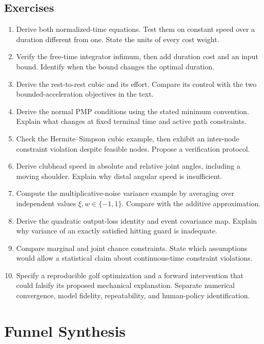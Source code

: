 \documentclass[12pt, openany]{book}
\theoremstyle{plain}
\begin{document}
\section{Exercises}

\begin{enumerate}[itemsep=3pt,parsep=0pt]
\item Derive both normalized-time equations. Test them on constant speed
over a duration different from one. State the units of every cost weight.
\item Verify the free-time integrator infimum, then add duration cost and
an input bound. Identify when the bound changes the optimal duration.
\item Derive the rest-to-rest cubic and its effort. Compare its control
with the two bounded-acceleration objectives in the text.
\item Derive the normal PMP conditions using the stated minimum convention.
Explain what changes at fixed terminal time and active path constraints.
\item Check the Hermite--Simpson cubic example, then exhibit an inter-node
constraint violation despite feasible nodes. Propose a verification protocol.
\item Derive clubhead speed in absolute and relative joint angles, including
a moving shoulder. Explain why distal angular speed is insufficient.
\item Compute the multiplicative-noise variance example by averaging over
independent values $\xi,w\in\{-1,1\}$. Compare with the additive approximation.
\item Derive the quadratic output-loss identity and event covariance map.
Explain why variance of an exactly satisfied hitting guard is inadequate.
\item Compare marginal and joint chance constraints. State which assumptions
would allow a statistical claim about continuous-time constraint violations.
\item Specify a reproducible golf optimization and a forward intervention
that could falsify its proposed mechanical explanation. Separate numerical
convergence, model fidelity, repeatability, and human-policy identification.
\end{enumerate}

\chapter{Funnel Synthesis}
\label{ch:funnel_synthesis}
\end{document}
